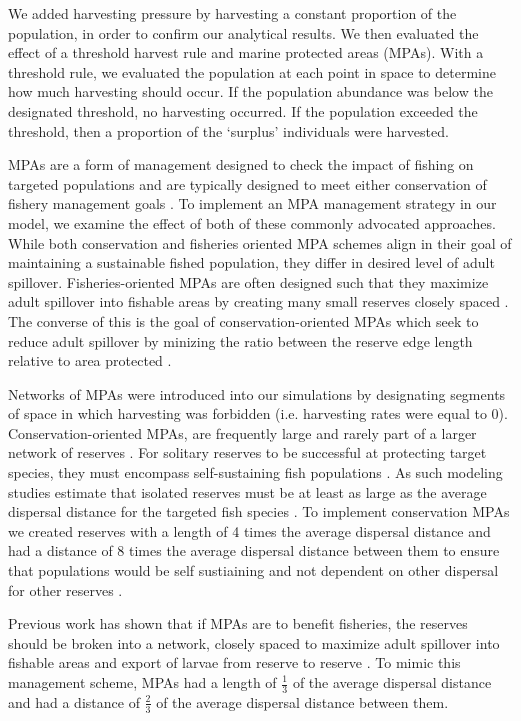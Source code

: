 \documentclass[12pt,english]{article}
\begin{document}
We added harvesting pressure by harvesting a constant proportion of the population, in order to confirm our analytical results. We then evaluated the effect of a threshold harvest rule and marine protected 
areas (MPAs).  With a threshold rule, we evaluated the population at each point in space to determine how 
much harvesting should occur. If the population abundance was below the designated threshold, no 
harvesting occurred. If the population exceeded the threshold, then a proportion of the `surplus' individuals 
were harvested.

MPAs are a form of management designed to check the impact of fishing on targeted populations and are typically designed to meet either conservation of fishery management goals \citep{Agardy1994, HollandBrazee1996, Gainesetal2010a}. To implement an MPA management strategy in our model, we examine the effect of both of these commonly advocated approaches. While both conservation and fisheries oriented MPA schemes align in their goal of maintaining a sustainable fished population, they differ in desired level of adult spillover. Fisheries-oriented MPAs are often designed such that they maximize adult spillover into fishable areas by creating many small reserves closely spaced \citep{HastingsBotsford2003}. The converse of this is the goal of conservation-oriented MPAs which seek to reduce adult spillover by minizing the ratio between the reserve edge length relative to area protected \citep{Gainesetal2010a}. 

Networks of MPAs were introduced into our simulations by designating segments of space in which harvesting was forbidden (i.e. harvesting rates were equal to $0$). Conservation-oriented MPAs, are frequently large and rarely part of a larger network of reserves \citep{HastingsBotsford2003}. For solitary reserves to be successful at protecting target species, they must encompass self-sustaining fish populations \citep{HastingsBotsford2006, Gainesetal2010a}. As such modeling studies estimate that isolated reserves must be at least as large as the average dispersal distance for the targeted fish species \citep{Lockwoodetal2002, HastingsBotsford2003, Botsfordetal2001, Gainesetal2010}. To implement conservation MPAs we created reserves with a length of 4 times the average dispersal distance and had a distance of 8 times the average dispersal distance between them to ensure that populations would be self sustiaining and not dependent on other dispersal for other reserves \citep{Lockwoodetal2002}. 

Previous work has shown that if MPAs are to benefit fisheries, the reserves should be broken into a network, closely spaced to maximize adult spillover into fishable areas and export of larvae from reserve to reserve \citep{ HastingsBotsford2003, Gaylordetal2005, Gainesetal2010a}. To mimic this management scheme, MPAs had a length of $\tfrac{1}{3}$ of the average dispersal distance and had a distance of $\tfrac{2}{3}$ of the average dispersal distance between them. 
\end{document}
